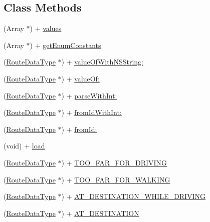 \subsection*{Class Methods}
\begin{DoxyCompactItemize}
\item 
(Array $\ast$) + \hyperlink{interface_route_data_type_ab9b66365f6aaaea857092f694151d491}{values}
\item 
(Array $\ast$) + \hyperlink{interface_route_data_type_af70ade69336015c8570526f895c2558f}{get\+Enum\+Constants}
\item 
(\hyperlink{interface_route_data_type}{Route\+Data\+Type} $\ast$) + \hyperlink{interface_route_data_type_aa874df869757ffb5bb56b12af8767031}{value\+Of\+With\+N\+S\+String\+:}
\item 
(\hyperlink{interface_route_data_type}{Route\+Data\+Type} $\ast$) + \hyperlink{interface_route_data_type_a04cd02e639e8e7ec5648be7d54c050f9}{value\+Of\+:}
\item 
(\hyperlink{interface_route_data_type}{Route\+Data\+Type} $\ast$) + \hyperlink{interface_route_data_type_a3679f987b65f5bfddb6dc36827fb4976}{parse\+With\+Int\+:}
\item 
(\hyperlink{interface_route_data_type}{Route\+Data\+Type} $\ast$) + \hyperlink{interface_route_data_type_a3529d6df6bb538155b5a20c50262ca77}{from\+Id\+With\+Int\+:}
\item 
(\hyperlink{interface_route_data_type}{Route\+Data\+Type} $\ast$) + \hyperlink{interface_route_data_type_afe278643862429813c3362fa7ec9faa7}{from\+Id\+:}
\item 
(void) + \hyperlink{interface_route_data_type_a40edb89d2b94bec3f9aa4caadebe7db7}{load}
\item 
(\hyperlink{interface_route_data_type}{Route\+Data\+Type} $\ast$) + \hyperlink{interface_route_data_type_a488f70e5ce902b0eab71db4499a31a81}{T\+O\+O\+\_\+\+F\+A\+R\+\_\+\+F\+O\+R\+\_\+\+D\+R\+I\+V\+I\+N\+G}
\item 
(\hyperlink{interface_route_data_type}{Route\+Data\+Type} $\ast$) + \hyperlink{interface_route_data_type_aa77eca2cca12e2b1b9bc792600969b27}{T\+O\+O\+\_\+\+F\+A\+R\+\_\+\+F\+O\+R\+\_\+\+W\+A\+L\+K\+I\+N\+G}
\item 
(\hyperlink{interface_route_data_type}{Route\+Data\+Type} $\ast$) + \hyperlink{interface_route_data_type_a57e0819f196484e10c040c645bc003b7}{A\+T\+\_\+\+D\+E\+S\+T\+I\+N\+A\+T\+I\+O\+N\+\_\+\+W\+H\+I\+L\+E\+\_\+\+D\+R\+I\+V\+I\+N\+G}
\item 
(\hyperlink{interface_route_data_type}{Route\+Data\+Type} $\ast$) + \hyperlink{interface_route_data_type_af754c769b946d717ef41af079d28f201}{A\+T\+\_\+\+D\+E\+S\+T\+I\+N\+A\+T\+I\+O\+N}

\end{DoxyCompactItemize}
